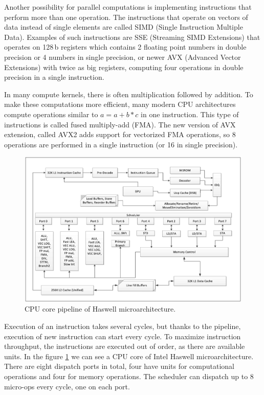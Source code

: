 Another possibility for parallel computations is implementing instructions that perform more than one operation. The instructions that operate on vectors of data instead of single elements are called SIMD (Single Instruction Multiple Data). Examples of such instructions are SSE (Streaming SIMD Extensions) that operates on 128\,b registers which contains 2 floating point numbers in double precision or 4 numbers in single precision, or newer AVX (Advanced Vector Extensions) with twice as big registers, computing four operations in double precision in a single instruction.

In many compute kernels, there is often multiplication followed by addition. To make these computations more efficient, many modern CPU architectures compute operations similar to $a=a+b*c$ in one instruction. This type of instructions is called fused multiply-add (FMA).
The new version of AVX extension, called AVX2 adds support for vectorized FMA operations, so 8 operations are performed in a single instruction (or 16 in single precision).

\begin{figure}[ht]
  \centering
  \includegraphics[width=\textwidth]{images/haswell_microarchitecture.png}
  \caption{CPU core pipeline of Haswell microarchitecture. }
  \label{fig:hsw-microarch}
\end{figure}

Execution of an instruction takes several cycles, but thanks to the pipeline, execution of new instruction can start every cycle.
To maximize instruction throughput, the instructions are executed out of order, as there are available units.
In the figure \ref{fig:hsw-microarch} we can see a CPU core of Intel Haswell microarchitecture. There are eight dispatch ports in total, four have units for computational operations and four for memory operations. The scheduler can dispatch up to 8 micro-ops every cycle, one on each port.

